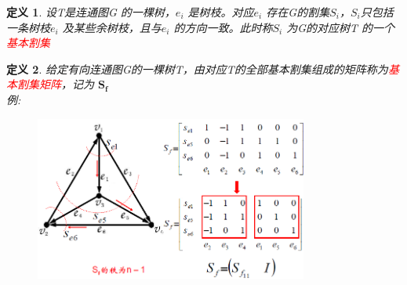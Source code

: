 \documentclass[11pt,a4paper,openany]{book}
\newtheorem{defination}{\textbf{定义}}[section]
\begin{document}
\begin{defination}
设T是连通图G 的一棵树，$e_i$ 是树枝。对应$e_i$ 存在G的割集$S_i$，$S_i$只包括一条树枝$e_i$ 及某些余树枝，且与$e_i$ 的方向一致。此时称$S_i$ 为G的对应树T 的一个\textcolor{red}{基本割集}\\
\end{defination}

\begin{defination}
给定有向连通图G的一棵树T，由对应T的全部基本割集组成的矩阵称为\textcolor{red}{基本割集矩阵}，记为
$\mathbf{S_f}$\\
例:
\begin{figure}[H]
  \centering
  \includegraphics[width=0.8\textwidth]{f4.png}\\
  \caption*{}
\end{figure}

\end{defination}
\end{document}
